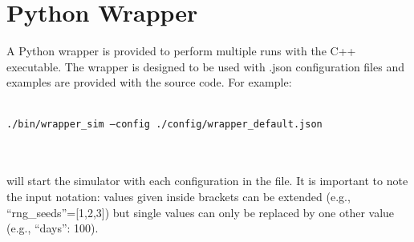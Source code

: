 \section{Python Wrapper}
A Python wrapper is provided to perform multiple runs with the C++ executable. 
The wrapper is designed to be used with .json configuration files and examples are provided with the source code. 
For example: \\ \\
\centerline{\texttt{./bin/wrapper\_sim --config ./config/wrapper\_default.json}} \\ \\
will start the simulator with each configuration in the file.
It is important to note the input notation: values given inside brackets can be extended (e.g., ``rng\_seeds''=[1,2,3]) but single values can only be replaced by one other value (e.g., ``days'': 100).


